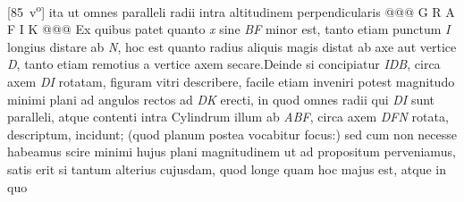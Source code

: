 [85~v\textsuperscript{o}] ita ut omnes paralleli radii intra altitudinem perpendicularis @@@ G R A F I K @@@%
                      Ex quibus patet quanto \textit{x} sine \textit{BF} minor est, tanto etiam  punctum \textit{I} longius distare ab \textit{N}, hoc est quanto radius  aliquis magis distat ab axe aut vertice \textit{D}, tanto etiam  remotius a vertice axem secare.\pend \pstart Deinde si concipiatur \textit{IDB}, circa axem \textit{DI} rotatam, figuram  vitri describere, facile etiam inveniri potest magnitudo  minimi plani ad angulos rectos ad \textit{DK} erecti, in quod omnes  radii qui \textit{DI} sunt paralleli, atque contenti intra Cylindrum illum  ab \textit{ABF}, circa axem \textit{DFN} rotata, descriptum, incidunt; (quod planum postea vocabitur focus:) sed cum non necesse  habeamus scire minimi hujus plani magnitudinem ut ad  propositum perveniamus, satis erit si tantum alterius  cujusdam, quod longe quam hoc majus est, atque in quo 